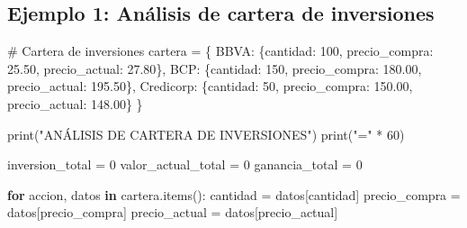 \documentclass[
  doc,
  floatsintext,
  longtable,
  a4paper,
  nolmodern,
  notxfonts,
  notimes,
  12pt,
  colorlinks=true,linkcolor=blue,citecolor=blue,urlcolor=blue]{apa7}
\newenvironment{Shaded}{\begin{snugshade}}{\end{snugshade}}
\newcommand{\BuiltInTok}[1]{\textcolor[rgb]{0.00,0.23,0.31}{#1}}
\newcommand{\CommentTok}[1]{\textcolor[rgb]{0.37,0.37,0.37}{#1}}
\newcommand{\ControlFlowTok}[1]{\textcolor[rgb]{0.00,0.23,0.31}{\textbf{#1}}}
\newcommand{\DecValTok}[1]{\textcolor[rgb]{0.68,0.00,0.00}{#1}}
\newcommand{\FloatTok}[1]{\textcolor[rgb]{0.68,0.00,0.00}{#1}}
\newcommand{\KeywordTok}[1]{\textcolor[rgb]{0.00,0.23,0.31}{\textbf{#1}}}
\newcommand{\NormalTok}[1]{\textcolor[rgb]{0.00,0.23,0.31}{#1}}
\newcommand{\OperatorTok}[1]{\textcolor[rgb]{0.37,0.37,0.37}{#1}}
\newcommand{\StringTok}[1]{\textcolor[rgb]{0.13,0.47,0.30}{#1}}
\begin{document}
\subsection{Ejemplo 1: Análisis de cartera de
inversiones}\label{ejemplo-1-anuxe1lisis-de-cartera-de-inversiones}

\begin{Shaded}
\begin{Highlighting}[]
\CommentTok{\# Cartera de inversiones}
\NormalTok{cartera }\OperatorTok{=}\NormalTok{ \{}
    \StringTok{\textquotesingle{}BBVA\textquotesingle{}}\NormalTok{: \{}\StringTok{\textquotesingle{}cantidad\textquotesingle{}}\NormalTok{: }\DecValTok{100}\NormalTok{, }\StringTok{\textquotesingle{}precio\_compra\textquotesingle{}}\NormalTok{: }\FloatTok{25.50}\NormalTok{, }\StringTok{\textquotesingle{}precio\_actual\textquotesingle{}}\NormalTok{: }\FloatTok{27.80}\NormalTok{\},}
    \StringTok{\textquotesingle{}BCP\textquotesingle{}}\NormalTok{: \{}\StringTok{\textquotesingle{}cantidad\textquotesingle{}}\NormalTok{: }\DecValTok{150}\NormalTok{, }\StringTok{\textquotesingle{}precio\_compra\textquotesingle{}}\NormalTok{: }\FloatTok{180.00}\NormalTok{, }\StringTok{\textquotesingle{}precio\_actual\textquotesingle{}}\NormalTok{: }\FloatTok{195.50}\NormalTok{\},}
    \StringTok{\textquotesingle{}Credicorp\textquotesingle{}}\NormalTok{: \{}\StringTok{\textquotesingle{}cantidad\textquotesingle{}}\NormalTok{: }\DecValTok{50}\NormalTok{, }\StringTok{\textquotesingle{}precio\_compra\textquotesingle{}}\NormalTok{: }\FloatTok{150.00}\NormalTok{, }\StringTok{\textquotesingle{}precio\_actual\textquotesingle{}}\NormalTok{: }\FloatTok{148.00}\NormalTok{\}}
\NormalTok{\}}

\BuiltInTok{print}\NormalTok{(}\StringTok{"ANÁLISIS DE CARTERA DE INVERSIONES"}\NormalTok{)}
\BuiltInTok{print}\NormalTok{(}\StringTok{"="} \OperatorTok{*} \DecValTok{60}\NormalTok{)}

\NormalTok{inversion\_total }\OperatorTok{=} \DecValTok{0}
\NormalTok{valor\_actual\_total }\OperatorTok{=} \DecValTok{0}
\NormalTok{ganancia\_total }\OperatorTok{=} \DecValTok{0}

\ControlFlowTok{for}\NormalTok{ accion, datos }\KeywordTok{in}\NormalTok{ cartera.items():}
\NormalTok{    cantidad }\OperatorTok{=}\NormalTok{ datos[}\StringTok{\textquotesingle{}cantidad\textquotesingle{}}\NormalTok{]}
\NormalTok{    precio\_compra }\OperatorTok{=}\NormalTok{ datos[}\StringTok{\textquotesingle{}precio\_compra\textquotesingle{}}\NormalTok{]}
\NormalTok{    precio\_actual }\OperatorTok{=}\NormalTok{ datos[}\StringTok{\textquotesingle{}precio\_actual\textquotesingle{}}\NormalTok{]}
    

\end{Highlighting}
\end{Shaded}
\end{document}
